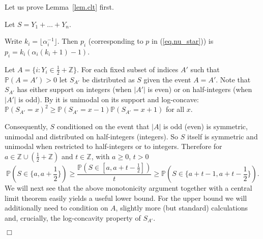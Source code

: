 \documentclass{article}
\newenvironment{proofof}[1]{\noindent {\bf Proof of #1}}{\hspace*{\fill}$\Box$}
\newcommand{\pr}{\mathbb P}
\begin{document}
Let us prove Lemma~\ref{lem.clt} first.

\medskip

\begin{proofof}{Lemma~\ref{lem.clt}}
    Let $S = Y_1 + \dots + Y_n$.

    Write $k_i = \lfloor \alpha_i^{-1} \rfloor$. Then $p_i$ (corresponding to $p$ in (\ref{eq.nu_star}))
    is $p_i = k_i (\alpha_i (k_i+1) - 1)$.


    Let $A = \{i: Y_i \in \frac 1 2 + \mathbb{Z}\}$. For each fixed subset of indices $A'$ such that $\pr(A = A') > 0$ let $S_{A'}$ be distributed as $S$ given the event $A = A'$.
    Note that $S_{A'}$ has either support on integers (when $|A'|$ is even) or on half-integers (when $|A'|$ is odd). By \cite{keilsongerber} it is unimodal on its support and log-concave: $\pr(S_{A'} = x)^2 \ge \pr(S_{A'}=x-1) \pr(S_{A'}=x+1)$ for all $x$.

    Consequently, $S$ conditioned on the event that $|A|$ is odd (even) is symmetric, unimodal and distributed on half-integers (integers).
    So $S$ itself is symmetric and unimodal when restricted to half-integers or to integers. Therefore for $a \in \mathbb{Z} \cup (\frac 1 2 + \mathbb{Z})$ and $t \in \mathbb{Z}$, with $a \ge 0$, $t >0$
\[
    \pr(S \in \{a, a+\frac 1 2\}) \ge \frac {\pr(S \in [a, a+t-\frac 1 2])} {t} \ge \pr(S \in \{a+t-1, a+t-\frac 1 2\}).
\]
    We will next see that the above monotonicity argument together with a central limit theorem easily yields a useful lower bound. For the upper bound we will additionally need to condition on $A$, slightly more (but standard) calculations and, crucially, the log-concavity property of $S_{A'}$.


\end{proofof}
\end{document}

